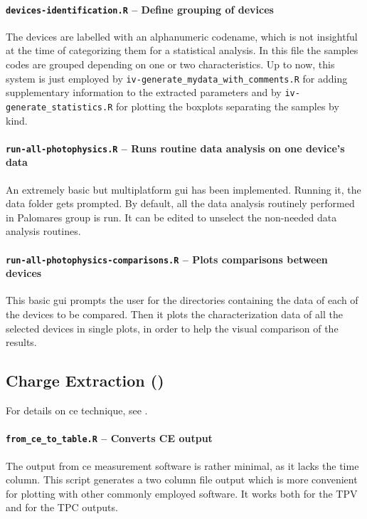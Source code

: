 		\paragraph{\texttt{devices-identification.R} -- Define grouping of devices}
		The devices are labelled with an alphanumeric codename, which is not insightful at the time of categorizing them for a statistical analysis.
		In this file the samples codes are grouped depending on one or two characteristics.
		Up to now, this system is just employed by \texttt{iv-generate\_mydata\_with\_comments.R} for adding supplementary information to the extracted parameters and by \texttt{iv-generate\_statistics.R} for plotting the boxplots separating the samples by kind.

		\paragraph{\texttt{run-all-photophysics.R} -- Runs routine data analysis on one device's data}
		An extremely basic but multiplatform \gls{gui} has been implemented.
		Running it, the data folder gets prompted.
		By default, all the data analysis routinely performed in Palomares group is run.
		It can be edited to unselect the non-needed data analysis routines.
		
		\paragraph{\texttt{run-all-photophysics-comparisons.R} -- Plots comparisons between devices}
		This basic \gls{gui} prompts the user for the directories containing the data of each of the devices to be compared.
		Then it plots the characterization data of all the selected devices in single plots, in order to help the visual comparison of the results.
		


	\subsection{Charge Extraction ()}\label{r_ce}
	For details on \gls{ce} technique, see .

		\paragraph{\texttt{from\_ce\_to\_table.R} -- Converts CE output}
		The output from \gls{ce} measurement software is rather minimal, as it lacks the time column.
		This script generates a two column file output which is more convenient for plotting with other commonly employed software.
		It works both for the TPV and for the TPC outputs.
		

